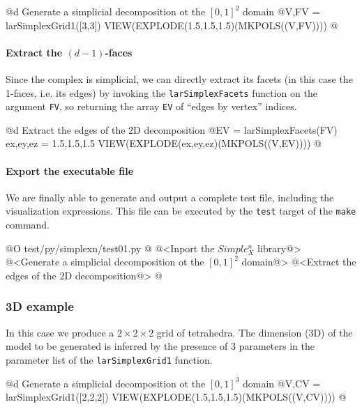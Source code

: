 \documentclass[11pt,oneside]{article}	%
\begin{document}
@d Generate a simplicial decomposition ot the $[0,1]^2$ domain
@{V,FV = larSimplexGrid1([3,3])
VIEW(EXPLODE(1.5,1.5,1.5)(MKPOLS((V,FV))))
@}

\paragraph{Extract the $(d-1)$-faces}
Since the complex is simplicial, we can directly extract its facets (in this case the 1-faces, i.e. its edges) by invoking the \texttt{larSimplexFacets} function on the argument \texttt{FV}, so returning the array \texttt{EV} of ``edges by vertex'' indices. 

@d Extract the edges of the 2D decomposition
@{EV = larSimplexFacets(FV)
ex,ey,ez = 1.5,1.5,1.5
VIEW(EXPLODE(ex,ey,ez)(MKPOLS((V,EV))))
@}

\paragraph{Export the executable file}
We are finally able to generate and output a complete test file, including the visualization expressions. This file can be executed by the \texttt{test} target of the \texttt{make} command.

@O test/py/simplexn/test01.py
@{
@<Inport the $Simple_X^n$ library@>
@<Generate a simplicial decomposition ot the $[0,1]^2$ domain@>
@<Extract the edges of the 2D decomposition@>
@}

\subsubsection{3D example}

In this case we produce a $2\times 2\times 2$ grid of tetrahedra. The dimension (3D) of the model to be generated is inferred by the presence of 3 parameters in the parameter list of the \texttt{larSimplexGrid1} function. 

@d Generate a simplicial decomposition ot the $[0,1]^3$ domain
@{V,CV = larSimplexGrid1([2,2,2])
VIEW(EXPLODE(1.5,1.5,1.5)(MKPOLS((V,CV))))
@}
\end{document}
